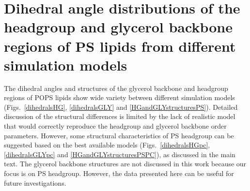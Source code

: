 \documentclass[journal=jpcbfk,manuscript=article]{achemso}
\begin{document}
\pagebreak
\section{Dihedral angle distributions of the headgroup and glycerol backbone
  regions of PS lipids from different simulation models}\label{Diheds}

The dihedral angles and structures of the glycerol backbone and headgroup regions of POPS lipids show
wide variety between different simulation models (Figs.~\ref{dihedralsHG}, \ref{dihedralsGLY} and \ref{HGandGLYstructuresPS}).
Detailed discussion of the structural differences is limited by the lack of realistic model that would correctly reproduce the
headgroup and glycerol backbone order parameters. However, some structural characteristics
of PS headgroup can be suggested based on the best available models
(Figs.~\ref{dihedralsHGpc}, \ref{dihedralsGLYpc} and \ref{HGandGLYstructuresPSPC}), as discussed in the main text.
The glycerol backbone structures are not discussed in this work because our focus is on PS headgroup.
However, the data presented here can be useful for future investigations.
\end{document}
